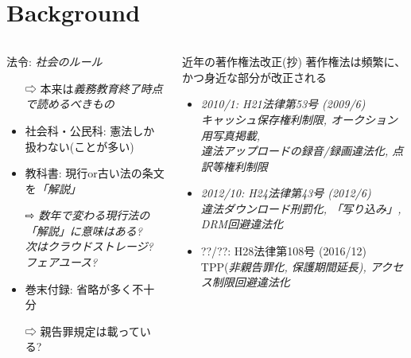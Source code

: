 \def\Title{\hfill \huge{変化する社会への適応力を涵養する著作権法の教育実践} \hfill}
\def\Author{大西 洋 (京都市立西京高校)}




\nocite{*}
\Header

\section{Background}
\begin{columns}[onlytextwidth,t]
\begin{column}{.35\hsize}
\begin{block}{\insertsection}
\alert{法令}: \em{社会のルール}
\begin{itemize}
\item[⇨] 本来は\em{義務教育終了時点で読めるべき}もの
\item 社会科・公民科: 憲法しか扱わない(ことが多い)
\item 教科書: 現行or古い法の条文を\em{「解説」}
\item[⇨] \em{数年で変わる}現行法の「解説」に意味はある? \\
	次はクラウドストレージ? フェアユース?
\item 巻末付録: 省略が多く不十分
\item[⇨] 親告罪規定は載っている?
\end{itemize}
\end{block}
\end{column}
\begin{column}{.45\hsize}
\begin{block}{近年の著作権法改正(抄)}
著作権法は\alert{頻繁}に、かつ\alert{身近な部分}が改正される\cite{hourei}
\begin{itemize}
\item \em{2010}/1: H21法律第53号 (2009/6) \\
	キャッシュ保存権利制限, \em{オークション}用写真掲載, \\
	\em{違法アップロードの録音/録画}違法化, 点訳等権利制限
\item \em{2012}/10: H24法律第43号 (2012/6) \\
	\em{違法ダウンロード}刑罰化, \em{「写り込み」}, \em{DRM回避}違法化
\item ??/??: H28法律第108号 (2016/12) \\
	\alert{TPP}(\em{非親告罪化}, \em{保護期間延長}), \em{アクセス制限回避}違法化
\end{itemize}
\end{block}

\end{column}
\end{columns}
